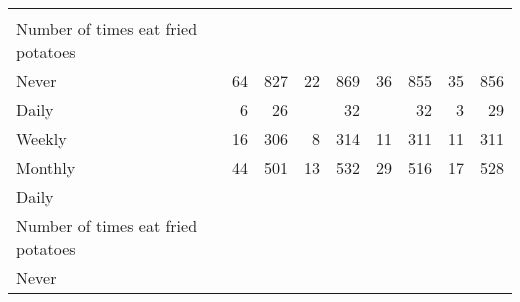 \documentclass{article}
\begin{document}
\begin{tabular}{lllllllll}
  \multicolumn{1}{r}{} &
  \multicolumn{1}{r}{} &
  \multicolumn{1}{r}{} &
  \multicolumn{1}{r}{} \\
\multicolumn{1}{l}{\hspace{4em}Number of times eat fried potatoes} &
  \multicolumn{1}{|r}{} &
  \multicolumn{1}{r}{} &
  \multicolumn{1}{r}{} &
  \multicolumn{1}{r}{} &
  \multicolumn{1}{r}{} &
  \multicolumn{1}{r}{} &
  \multicolumn{1}{r}{} &
  \multicolumn{1}{r}{} \\
\multicolumn{1}{l}{\hspace{5em}Never} &
  \multicolumn{1}{|r}{64} &
  \multicolumn{1}{r}{827} &
  \multicolumn{1}{r}{22} &
  \multicolumn{1}{r}{869} &
  \multicolumn{1}{r}{36} &
  \multicolumn{1}{r}{855} &
  \multicolumn{1}{r}{35} &
  \multicolumn{1}{r}{856} \\
\multicolumn{1}{l}{\hspace{5em}Daily} &
  \multicolumn{1}{|r}{6} &
  \multicolumn{1}{r}{26} &
  \multicolumn{1}{r}{} &
  \multicolumn{1}{r}{32} &
  \multicolumn{1}{r}{} &
  \multicolumn{1}{r}{32} &
  \multicolumn{1}{r}{3} &
  \multicolumn{1}{r}{29} \\
\multicolumn{1}{l}{\hspace{5em}Weekly} &
  \multicolumn{1}{|r}{16} &
  \multicolumn{1}{r}{306} &
  \multicolumn{1}{r}{8} &
  \multicolumn{1}{r}{314} &
  \multicolumn{1}{r}{11} &
  \multicolumn{1}{r}{311} &
  \multicolumn{1}{r}{11} &
  \multicolumn{1}{r}{311} \\
\multicolumn{1}{l}{\hspace{5em}Monthly} &
  \multicolumn{1}{|r}{44} &
  \multicolumn{1}{r}{501} &
  \multicolumn{1}{r}{13} &
  \multicolumn{1}{r}{532} &
  \multicolumn{1}{r}{29} &
  \multicolumn{1}{r}{516} &
  \multicolumn{1}{r}{17} &
  \multicolumn{1}{r}{528} \\
\multicolumn{1}{l}{\hspace{3em}Daily} &
  \multicolumn{1}{|r}{} &
  \multicolumn{1}{r}{} &
  \multicolumn{1}{r}{} &
  \multicolumn{1}{r}{} &
  \multicolumn{1}{r}{} &
  \multicolumn{1}{r}{} &
  \multicolumn{1}{r}{} &
  \multicolumn{1}{r}{} \\
\multicolumn{1}{l}{\hspace{4em}Number of times eat fried potatoes} &
  \multicolumn{1}{|r}{} &
  \multicolumn{1}{r}{} &
  \multicolumn{1}{r}{} &
  \multicolumn{1}{r}{} &
  \multicolumn{1}{r}{} &
  \multicolumn{1}{r}{} &
  \multicolumn{1}{r}{} &
  \multicolumn{1}{r}{} \\
\multicolumn{1}{l}{\hspace{5em}Never} &

\end{tabular}
\end{document}
